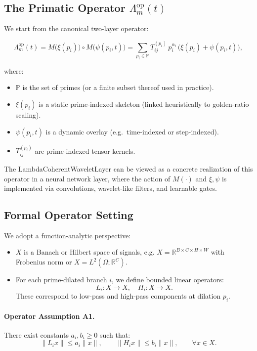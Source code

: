 \documentclass[11pt]{article}
\begin{document}
\subsection{The Primatic Operator \texorpdfstring{$\Lambda_m^{\mathrm{op}}(t)$}{Lambda\_m\^op(t)}}

We start from the canonical two-layer operator:

\begin{equation}
  \Lambda_m^{\mathrm{op}}(t)
  = M\bigl(\xi(p_i)\bigr) \circ M\bigl(\psi(p_i,t)\bigr)
  = \sum_{p_i \in \mathbb{P}} T_{ij}^{(p_i)}\, p_i^{\alpha_i}\, \bigl(\xi(p_i) + \psi(p_i,t)\bigr),
\end{equation}

where:
\begin{itemize}
  \item $\mathbb{P}$ is the set of primes (or a finite subset thereof used in practice).
  \item $\xi(p_i)$ is a static prime-indexed skeleton (linked heuristically to golden-ratio scaling).
  \item $\psi(p_i,t)$ is a dynamic overlay (e.g.\ time-indexed or step-indexed).
  \item $T_{ij}^{(p_i)}$ are prime-indexed tensor kernels.
\end{itemize}

The LambdaCoherentWaveletLayer can be viewed as a concrete realization of this operator in a neural network layer, where the action of $M(\cdot)$ and $\xi,\psi$ is implemented via convolutions, wavelet-like filters, and learnable gates.

\subsection{Formal Operator Setting}

We adopt a function-analytic perspective:

\begin{itemize}
  \item $X$ is a Banach or Hilbert space of signals, e.g. $X = \mathbb{R}^{B \times C \times H \times W}$ with Frobenius norm or $X = L^2(\Omega;\mathbb{R}^C)$.
  \item For each prime-dilated branch $i$, we define bounded linear operators:
  \[
    L_i : X \to X, \quad H_i : X \to X.
  \]
  These correspond to low-pass and high-pass components at dilation $p_i$.
\end{itemize}

\paragraph{Operator Assumption A1.} There exist constants $a_i, b_i \ge 0$ such that:
\[
  \|L_i x\| \le a_i \|x\|, \qquad \|H_i x\| \le b_i \|x\|, \qquad \forall x \in X.
\]
\end{document}
